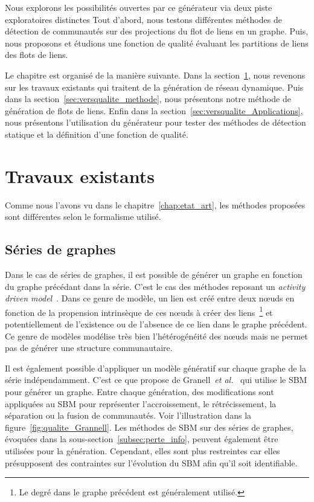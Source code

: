 \bigskip
Nous explorons les possibilités ouvertes par ce générateur via deux piste exploratoires distinctes
Tout d'abord, nous testons différentes méthodes de détection de communautés sur des projections du flot de liens en un graphe.
Puis, nous proposons et étudions une fonction de qualité évaluant les partitions de liens des flots de liens.

\bigskip

Le chapitre est organisé de la manière suivante.
Dans la section~\ref{sec:versqualite_existant}, nous revenons sur les travaux existants qui traitent de la génération de réseau dynamique.
Puis dans la section~\ref{sec:versqualite_methode}, nous présentons notre méthode de génération de flots de liens.
Enfin dans la section~\ref{sec:versqualite_Applications}, nous présentons l'utilisation du générateur pour tester des méthodes de détection statique et la définition d'une fonction de qualité.

\section{Travaux existants}
\label{sec:versqualite_existant}

Comme nous l'avons vu dans le chapitre~\ref{chap:etat_art}, les méthodes proposées sont différentes selon le formalisme utilisé.

\subsection{Séries de graphes}
Dans le cas de séries de graphes, il est possible de générer un graphe en fonction du graphe précédant dans la série.
C'est le cas des méthodes reposant un \emph{activity driven model}~\cite{Perra2012,Laurent2015a,Moinet2015}.
Dans ce genre de modèle, un lien est créé entre deux n\oe uds en fonction de la propension intrinsèque de ces n\oe uds à créer des liens~\footnote{Le degré dans le graphe précédent est généralement utilisé.} et potentiellement de l'existence ou de l'absence de ce lien dans le graphe précédent.
Ce genre de modèles modélise très bien l'hétérogénéité des n\oe uds mais ne permet pas de générer une structure communautaire.


Il est également possible d'appliquer un modèle génératif sur chaque graphe de la série indépendamment.
C'est ce que propose de Granell~\emph{et al.}~\cite{Granell2015a} qui utilise le SBM pour générer un graphe.
Entre chaque génération, des modifications sont appliquées au SBM pour représenter l'accroissement, le rétrécissement, la séparation ou la fusion de communautés.
Voir l'illustration dans la figure~\ref{fig:qualite_Grannell}.
Les méthodes de SBM sur des séries de graphes, évoquées dans la sous-section~\ref{subsec:perte_info}, peuvent également être utilisées pour la génération.
Cependant, elles sont plus restreintes car elles présupposent des contraintes sur l'évolution du SBM afin qu'il soit identifiable.

